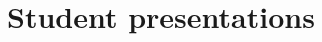 \documentclass[ngerman]{article}
\begin{document}
\title{\lectype\ \lecfulltitle}

\author{\lecinstructor}

\date{\lecsemester}

\maketitle

\section*{Student presentations}


\makepreslist

\end{document}
